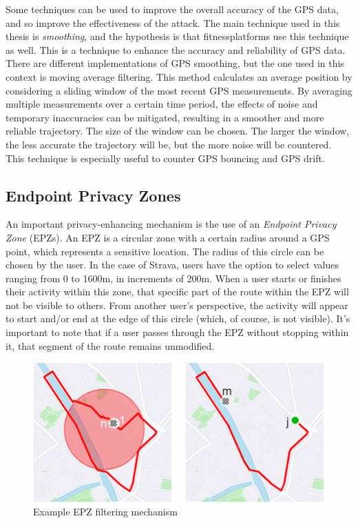 \documentclass[conference]{IEEEtran}
\begin{document}
Some techniques can be used to improve the overall accuracy of the GPS data,
and so improve the effectiveness of the attack. The main technique used in this
thesis is \textit{smoothing}, and the hypothesis is that fitnessplatforms use
this technique as well. This is a technique to enhance the accuracy and
reliability of GPS data. There are different implementations of GPS smoothing,
but the one used in this context is moving average filtering. This method
calculates an average position by considering a sliding window of the most
recent GPS measurements. By averaging multiple measurements over a certain time
period, the effects of noise and temporary inaccuracies can be mitigated,
resulting in a smoother and more reliable trajectory. The size of the window
can be chosen. The larger the window, the less accurate the trajectory will be,
but the more noise will be countered. This technique is especially useful to
counter GPS bouncing and GPS drift.

\subsection{Endpoint Privacy Zones}
An important privacy-enhancing mechanism is the use of an \textit{Endpoint
    Privacy Zone} (EPZs). An EPZ is a circular zone with a certain radius around a
GPS point, which represents a sensitive location. The radius of this circle can
be chosen by the user. In the case of Strava, users have the option to select
values ranging from 0 to 1600m, in increments of 200m. When a user starts or
finishes their activity within this zone, that specific part of the route
within the EPZ will not be visible to others. From another user's perspective,
the activity will appear to start and/or end at the edge of this circle (which,
of course, is not visible). It's important to note that if a user passes
through the EPZ without stopping within it, that segment of the route remains
unmodified.
\begin{figure}[h]
    \centering
    \includegraphics[width=\linewidth]{fig/EPZ-mechanisme/DropEPZPoints.png}
    \caption{Example EPZ filtering mechanism~\cite{Dhondt}}\label{fig:epzmechanisme}
\end{figure}
\end{document}
